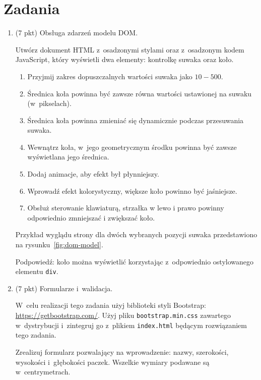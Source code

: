 \documentclass[12pt]{article}
\begin{document}
    \section*{Zadania}
        \begin{enumerate}
        \item\label{exc:dom-model}
            (7 pkt) Obsługa zdarzeń modelu DOM.

            Utwórz dokument HTML z~osadzonymi stylami oraz z~osadzonym kodem JavaScript, który wyświetli dwa elementy: kontrolkę suwaka oraz koło.

            \begin{enumerate}
                \item Przyjmij zakres dopuszczalnych wartości suwaka jako $10 - 500$.
                \item Średnica koła powinna być zawsze równa wartości ustawionej na suwaku (w~pikselach).
                \item Średnica koła powinna zmieniać się dynamicznie podczas przesuwania suwaka.
                \item Wewnątrz koła, w~jego geometrycznym środku powinna być zawsze wyświetlana jego średnica.
                \item Dodaj animacje, aby efekt był płynniejszy.
                \item Wprowadź efekt kolorystyczny, większe koło powinno być jaśniejsze.
                \item Obsłuż sterowanie klawiaturą, strzałka w lewo i prawo powinny odpowiednio zmniejszać i zwiększać koło.
            \end{enumerate}


            Przykład wyglądu strony dla dwóch wybranych pozycji suwaka przedstawiono na rysunku~\ref{fig:dom-model}.

            Podpowiedź: koło można wyświetlić korzystając z~odpowiednio ostylowanego elementu \texttt{div}.

            \item\label{exc:forms}
            (7 pkt) Formularze i~walidacja.

            W~celu realizacji tego zadania użyj biblioteki styli Bootstrap: \url{https://getbootstrap.com/}.
            Użyj pliku \texttt{bootstrap.min.css} zawartego w~dystrybucji i~zintegruj go z~plikiem \texttt{index.html} będącym rozwiązaniem tego zadania.

            Zrealizuj formularz pozwalający na wprowadzenie: nazwy, szerokości, wysokości i~głębokości paczek.
            Wszelkie wymiary podawane są w~centrymetrach.


\end{enumerate}
\end{document}

